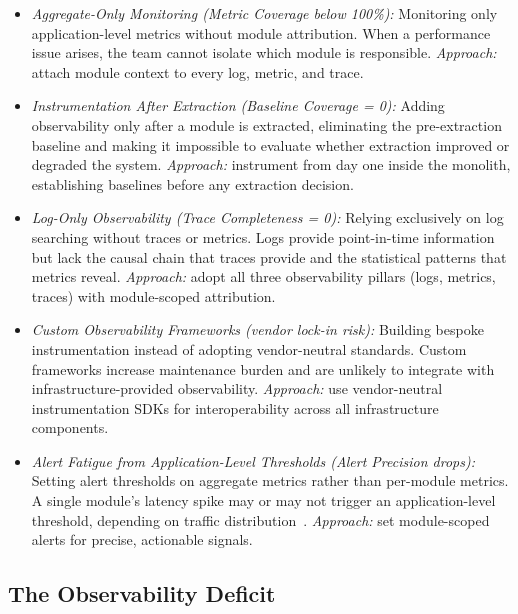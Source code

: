 \begin{itemize}[itemsep=8pt,topsep=2pt]
  \item \emph{Aggregate-Only Monitoring (Metric Coverage below 100\%):}
  Monitoring only application-level metrics without module attribution. When a performance issue arises, the team cannot isolate which module is responsible.
  \emph{Approach:} attach module context to every log, metric, and trace.

  \item \emph{Instrumentation After Extraction (Baseline Coverage = 0):}
  Adding observability only after a module is extracted, eliminating the pre-extraction baseline and making it impossible to evaluate whether extraction improved or degraded the system.
  \emph{Approach:} instrument from day one inside the monolith, establishing baselines before any extraction decision.

  \item \emph{Log-Only Observability (Trace Completeness = 0):}
  Relying exclusively on log searching without traces or metrics. Logs provide point-in-time information but lack the causal chain that traces provide and the statistical patterns that metrics reveal.
  \emph{Approach:} adopt all three observability pillars (logs, metrics, traces) with module-scoped attribution.

  \item \emph{Custom Observability Frameworks (vendor lock-in risk):}
  Building bespoke instrumentation instead of adopting vendor-neutral standards. Custom frameworks increase maintenance burden and are unlikely to integrate with infrastructure-provided observability.
  \emph{Approach:} use vendor-neutral instrumentation SDKs for interoperability across all infrastructure components.

  \item \emph{Alert Fatigue from Application-Level Thresholds (Alert Precision drops):}
  Setting alert thresholds on aggregate metrics rather than per-module metrics. A single module's latency spike may or may not trigger an application-level threshold, depending on traffic distribution~\cite{FordParsons2017}.
  \emph{Approach:} set module-scoped alerts for precise, actionable signals.
\end{itemize}

\subsection*{The Observability Deficit}
\label{sec:g6-observability-deficit}

